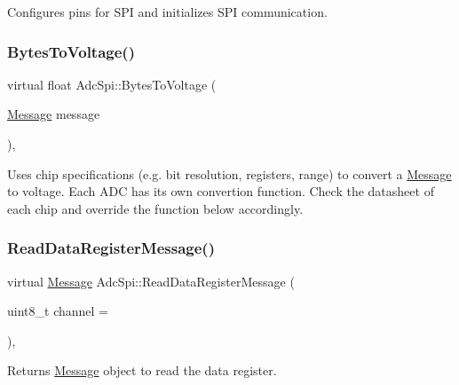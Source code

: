 Configures pins for S\+PI and initializes S\+PI communication. \mbox{\label{classAdcSpi_aa9970471c6fc505e4b91ac6985ac1489}} 
\subsubsection{\texorpdfstring{Bytes\+To\+Voltage()}{BytesToVoltage()}}
{\footnotesize\ttfamily virtual float Adc\+Spi\+::\+Bytes\+To\+Voltage (\begin{DoxyParamCaption}\item[{\mbox{\hyperlink{structAdcSpi_1_1Message}{Message}}}]{message }\end{DoxyParamCaption})\hspace{0.3cm}{\ttfamily [protected]}, {}}

Uses chip specifications (e.\+g. bit resolution, registers, range) to convert a \mbox{\hyperlink{structAdcSpi_1_1Message}{Message}} to voltage. Each A\+DC has its own convertion function. Check the datasheet of each chip and override the function below accordingly. \mbox{\label{classAdcSpi_acd92eec341ed010e5b7569ffcbba811d}} 
\subsubsection{\texorpdfstring{Read\+Data\+Register\+Message()}{ReadDataRegisterMessage()}}
{\footnotesize\ttfamily virtual \mbox{\hyperlink{structAdcSpi_1_1Message}{Message}} Adc\+Spi\+::\+Read\+Data\+Register\+Message (\begin{DoxyParamCaption}\item[{uint8\+\_\+t}]{channel = {} }\end{DoxyParamCaption})\hspace{0.3cm}{\ttfamily [protected]}, {}}

Returns \mbox{\hyperlink{structAdcSpi_1_1Message}{Message}} object to read the data register. \mbox{\label{classAdcSpi_aa245df90e70654aabc64f88107ccd804}} 
